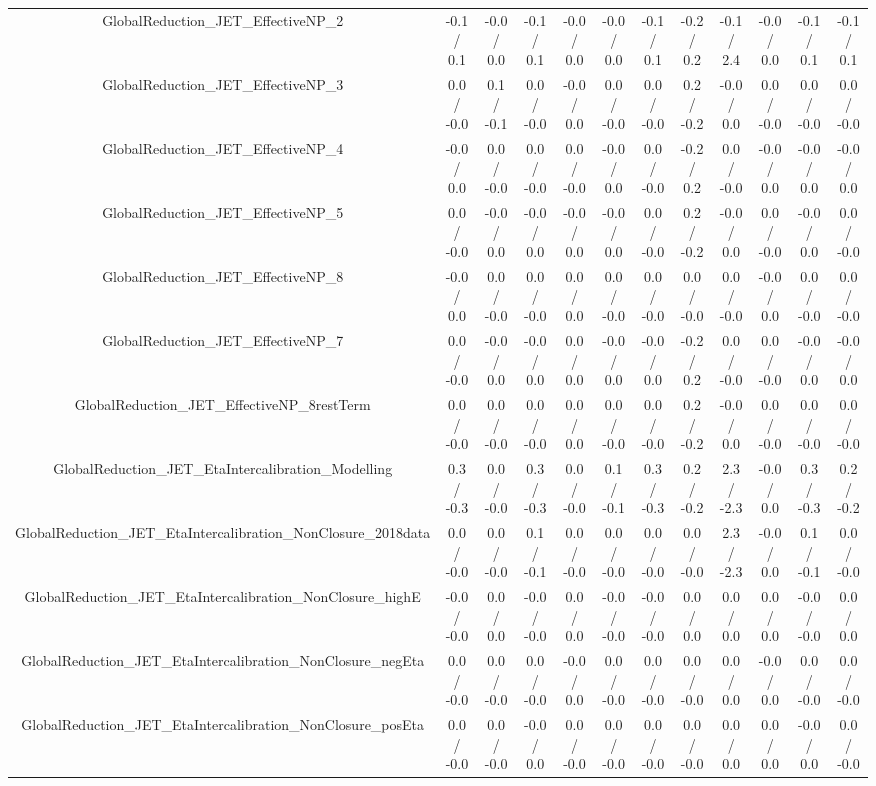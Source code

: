 \begin{table}[htbp]
\begin{center}
\begin{tabular}{|c|c|c|c|c|c|c|c|c|c|c|c|}
  GlobalReduction_JET_EffectiveNP_2 & -0.1 / 0.1 & -0.0 / 0.0 & -0.1 / 0.1 & -0.0 / 0.0 & -0.0 / 0.0 & -0.1 / 0.1 & -0.2 / 0.2 & -0.1 / 2.4 & -0.0 / 0.0 & -0.1 / 0.1 & -0.1 / 0.1 \\ 
  GlobalReduction_JET_EffectiveNP_3 & 0.0 / -0.0 & 0.1 / -0.1 & 0.0 / -0.0 & -0.0 / 0.0 & 0.0 / -0.0 & 0.0 / -0.0 & 0.2 / -0.2 & -0.0 / 0.0 & 0.0 / -0.0 & 0.0 / -0.0 & 0.0 / -0.0 \\ 
  GlobalReduction_JET_EffectiveNP_4 & -0.0 / 0.0 & 0.0 / -0.0 & 0.0 / -0.0 & 0.0 / -0.0 & -0.0 / 0.0 & 0.0 / -0.0 & -0.2 / 0.2 & 0.0 / -0.0 & -0.0 / 0.0 & -0.0 / 0.0 & -0.0 / 0.0 \\ 
  GlobalReduction_JET_EffectiveNP_5 & 0.0 / -0.0 & -0.0 / 0.0 & -0.0 / 0.0 & -0.0 / 0.0 & -0.0 / 0.0 & 0.0 / -0.0 & 0.2 / -0.2 & -0.0 / 0.0 & 0.0 / -0.0 & -0.0 / 0.0 & 0.0 / -0.0 \\ 
  GlobalReduction_JET_EffectiveNP_8 & -0.0 / 0.0 & 0.0 / -0.0 & 0.0 / -0.0 & 0.0 / 0.0 & 0.0 / -0.0 & 0.0 / -0.0 & 0.0 / -0.0 & 0.0 / -0.0 & -0.0 / 0.0 & 0.0 / -0.0 & 0.0 / -0.0 \\ 
  GlobalReduction_JET_EffectiveNP_7 & 0.0 / -0.0 & -0.0 / 0.0 & -0.0 / 0.0 & 0.0 / 0.0 & -0.0 / 0.0 & -0.0 / 0.0 & -0.2 / 0.2 & 0.0 / -0.0 & 0.0 / -0.0 & -0.0 / 0.0 & -0.0 / 0.0 \\ 
  GlobalReduction_JET_EffectiveNP_8restTerm & 0.0 / -0.0 & 0.0 / -0.0 & 0.0 / -0.0 & 0.0 / 0.0 & 0.0 / -0.0 & 0.0 / -0.0 & 0.2 / -0.2 & -0.0 / 0.0 & 0.0 / -0.0 & 0.0 / -0.0 & 0.0 / -0.0 \\ 
  GlobalReduction_JET_EtaIntercalibration_Modelling & 0.3 / -0.3 & 0.0 / -0.0 & 0.3 / -0.3 & 0.0 / -0.0 & 0.1 / -0.1 & 0.3 / -0.3 & 0.2 / -0.2 & 2.3 / -2.3 & -0.0 / 0.0 & 0.3 / -0.3 & 0.2 / -0.2 \\ 
  GlobalReduction_JET_EtaIntercalibration_NonClosure_2018data & 0.0 / -0.0 & 0.0 / -0.0 & 0.1 / -0.1 & 0.0 / -0.0 & 0.0 / -0.0 & 0.0 / -0.0 & 0.0 / -0.0 & 2.3 / -2.3 & -0.0 / 0.0 & 0.1 / -0.1 & 0.0 / -0.0 \\ 
  GlobalReduction_JET_EtaIntercalibration_NonClosure_highE & -0.0 / -0.0 & 0.0 / 0.0 & -0.0 / -0.0 & 0.0 / 0.0 & -0.0 / -0.0 & -0.0 / -0.0 & 0.0 / 0.0 & 0.0 / 0.0 & 0.0 / 0.0 & -0.0 / -0.0 & 0.0 / 0.0 \\ 
  GlobalReduction_JET_EtaIntercalibration_NonClosure_negEta & 0.0 / -0.0 & 0.0 / -0.0 & 0.0 / -0.0 & -0.0 / 0.0 & 0.0 / -0.0 & 0.0 / -0.0 & 0.0 / -0.0 & 0.0 / 0.0 & -0.0 / 0.0 & 0.0 / -0.0 & 0.0 / -0.0 \\ 
  GlobalReduction_JET_EtaIntercalibration_NonClosure_posEta & 0.0 / -0.0 & 0.0 / -0.0 & -0.0 / 0.0 & 0.0 / -0.0 & 0.0 / -0.0 & 0.0 / -0.0 & 0.0 / -0.0 & 0.0 / 0.0 & 0.0 / 0.0 & -0.0 / 0.0 & 0.0 / -0.0 \\ 

\end{tabular}
\end{center}
\end{table}
